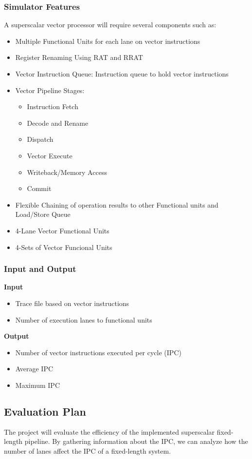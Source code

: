 \documentclass[12pt]{article}
\begin{document}
\subsubsection{Simulator Features}
A superscalar vector processor will require several components such as:
\begin{itemize}
    \item Multiple Functional Units for each lane on vector instructions
    \item Register Renaming Using RAT and RRAT 
    \item Vector Instruction Queue: Instruction queue to hold vector instructions
    \item Vector Pipeline Stages:

        \begin{itemize}
            \item Instruction Fetch
            \item Decode and Rename
            \item Dispatch
            \item Vector Execute
            \item Writeback/Memory Access
            \item Commit
        \end{itemize}
    \item Flexible Chaining of operation results to other
        Functional units and Load/Store Queue
    \item 4-Lane Vector Functional Units
    \item 4-Sets of Vector Funcional Units
\end{itemize}
\subsubsection{Input and Output}
\textbf{Input}
\begin{itemize}
    \item Trace file based on vector instructions 
    \item Number of execution lanes to functional units
\end{itemize}
\textbf{Output}
\begin{itemize}
    \item Number of vector instructions executed per cycle (IPC)
    \item Average IPC
    \item Maximum IPC
\end{itemize}
\subsection{Evaluation Plan}
The project will evaluate the efficiency of the implemented superscalar fixed-length pipeline. By
gathering information about the IPC, we can analyze how the number of lanes affect the IPC
of a fixed-length system. 
\end{document}
